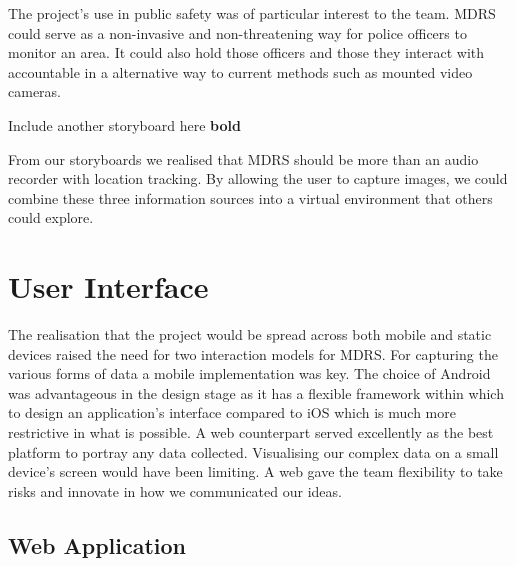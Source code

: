 \documentclass{l3proj}
\begin{document}
The project's use in public safety was of particular interest to the team. MDRS could serve as a non-invasive and non-threatening way for police officers to monitor an area. It could also hold those officers and those they interact with accountable in a alternative way to current methods such as mounted video cameras.

Include another storyboard here {\bf bold}

From our storyboards we realised that MDRS should be more than an audio recorder with location tracking. By allowing the user to capture images, we could combine these three information sources into a virtual environment that others could explore.

\section{User Interface} The realisation that the project would be spread across
both mobile and static devices raised the need for two interaction models for
MDRS. For capturing the various forms of data a mobile implementation was key. The choice of Android was advantageous in the design stage as it has a flexible framework within which to design an application's interface compared to iOS which is much more restrictive in what is possible. A web counterpart served excellently as the best platform to portray any data collected. Visualising our complex data on a small device's screen would have been limiting. A web gave the team flexibility to take risks and innovate in how we communicated our ideas.

\subsection{Web Application}


\end{document}
